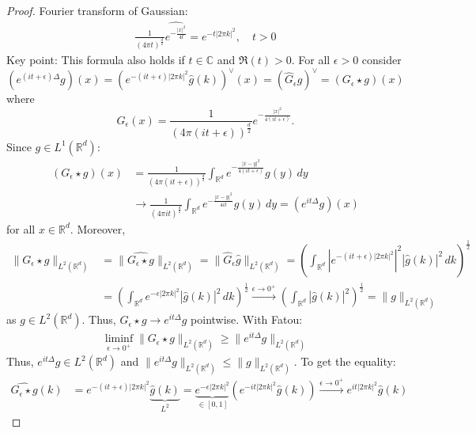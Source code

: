 \documentclass{report}
\theoremstyle{tommy}
\begin{document}
  \begin{proof}
    Fourier transform of Gaussian:
    \begin{align*}
      \frac{1}{(4 \pi t)^{\frac{d}{2}}} \widehat{e^{- \frac{|x|^2}{4t}}} = e^{-t |2 \pi k|^2}, \quad t > 0
    \end{align*}
    Key point: This formula also holds if \(t \in \mathbb{C}\) and \(\Re(t) > 0\).
    For all \(\epsilon > 0\) consider
    \[(e^{(it + \epsilon)\Delta} g)(x) = \left(e^{-(it + \epsilon) |2 \pi k|^2} \hat g (k)\right)^\lor (x) = (\hat G_\epsilon g)^\lor = (G_\epsilon \star g) (x)\] where 
    \[G_\epsilon(x) = \frac{1}{(4 \pi (it + \epsilon))^{\frac{d}{2}}} e^{- \frac{|x|^2}{4 (it + \epsilon)}}.\]
    Since \(g \in L^1(\mathbb{R}^d)\):
    \begin{align*}
      (G_\epsilon \star g)(x) &= \frac{1}{(4 \pi (it + \epsilon))^{\frac{d}{2}}} \int_{\mathbb{R}^d} e^{- \frac{|x-y|^2}{4(it + \epsilon)}} g(y) \, dy \\
      &\longrightarrow \frac{1}{(4 \pi it)^{\frac{d}{2}}} \int_{\mathbb{R}^d} e^{- \frac{|x-y|^2}{4 i t}} g(y) \, dy = (e^{it \Delta}g)(x)
    \end{align*}
    for all \(x \in \mathbb{R}^d\).
    Moreover, 
    \begin{align*}
      \|G_\epsilon \star g\|_{L^2(\mathbb{R}^d)} &= \| \widehat{G_\epsilon \star g} \|_{L^2(\mathbb{R}^d)} = \|\hat G_\epsilon \hat g\|_{L^2(\mathbb{R}^d)} = \left(\int_{\mathbb{R}^d} \left|e^{-(it + \epsilon)|2 \pi k|^2}\right|^2|\hat g (k)|^2 \, dk\right)^{\frac{1}{2}} \\
      &= \left(\int_{\mathbb{R}^d}e^{-\epsilon |2 \pi k|^2}|\hat g (k)|^2 \, dk\right)^{\frac{1}{2}} \xrightarrow{\epsilon \to 0^+} \left(\int_{\mathbb{R}^d} |\hat g(k)|^2\right)^{\frac{1}{2}} = \|g\|_{L^2(\mathbb{R}^d)}
    \end{align*}
    as \(g \in L^2(\mathbb{R}^d)\). Thus, \(G_\epsilon \star g \to e^{i t \Delta} g\) pointwise. With Fatou:
    \begin{align*}
      \liminf_{\epsilon \to 0^+} \|G_\epsilon \star g\|_{L^2(\mathbb{R}^d)} \ge \|e^{i t \Delta} g\|_{L^2(\mathbb{R}^d)}
    \end{align*}
    Thus, \(e^{it \Delta} g \in L^2(\mathbb{R}^d)\) and  \(\|e^{it \Delta} g\|_{L^2(\mathbb{R}^d)} \le \|g\|_{L^2(\mathbb{R}^d)}\).
    To get the equality:
    \begin{align*}
      \widehat{G_\epsilon \star g}(k) &= e^{-(it + \epsilon)|2 \pi k|^2}  \underbrace{\hat g(k)}_{L^2} = \underbrace{e^{-\epsilon | 2 \pi k|^2}}_{\in [0,1]} \left(e^{-it |2 \pi k|^2} \hat g(k)\right) \xrightarrow{\epsilon \to 0^+} e^{it|2 \pi k|^2} \hat g(k)

\end{align*}
\end{proof}
\end{document}
